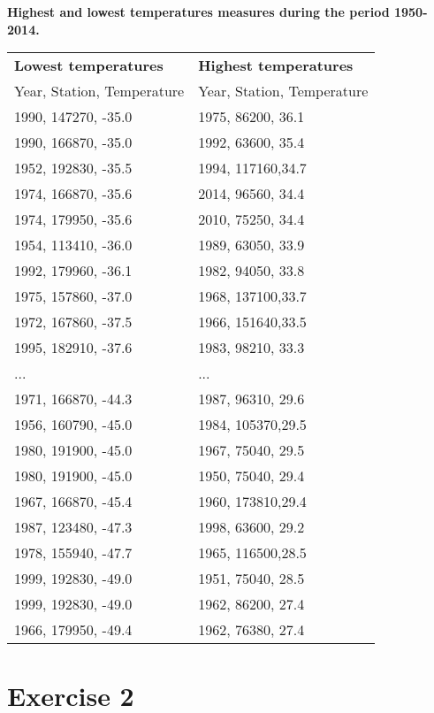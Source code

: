 \documentclass[a4paper,titlepage,12pt]{article}
\begin{document}
\textbf{Highest and lowest temperatures measures during the period 1950-2014.}
\begin{tabular}{l | l}
  \bf Lowest temperatures & \bf Highest temperatures \\ 
  Year, Station, Temperature & Year, Station, Temperature \\
  \hline
  1990, 147270, -35.0 & 1975, 86200, 36.1 \\ 
  1990, 166870, -35.0 & 1992, 63600, 35.4 \\ 
  1952, 192830, -35.5 & 1994, 117160,34.7 \\
  1974, 166870, -35.6 & 2014, 96560, 34.4 \\
  1974, 179950, -35.6 & 2010, 75250, 34.4 \\
  1954, 113410, -36.0 & 1989, 63050, 33.9 \\
  1992, 179960, -36.1 & 1982, 94050, 33.8 \\
  1975, 157860, -37.0 & 1968, 137100,33.7 \\
  1972, 167860, -37.5 & 1966, 151640,33.5 \\
  1995, 182910, -37.6 & 1983, 98210, 33.3 \\
  ... & ... \\
  1971, 166870, -44.3 & 1987, 96310, 29.6 \\
  1956, 160790, -45.0 & 1984, 105370,29.5 \\
  1980, 191900, -45.0 & 1967, 75040, 29.5 \\
  1980, 191900, -45.0 & 1950, 75040, 29.4 \\
  1967, 166870, -45.4 & 1960, 173810,29.4 \\
  1987, 123480, -47.3 & 1998, 63600, 29.2 \\
  1978, 155940, -47.7 & 1965, 116500,28.5 \\
  1999, 192830, -49.0 & 1951, 75040, 28.5 \\
  1999, 192830, -49.0 & 1962, 86200, 27.4 \\
  1966, 179950, -49.4 & 1962, 76380, 27.4 \\
\end{tabular}

\section{Exercise 2}
\end{document}
